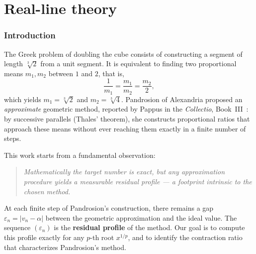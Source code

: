 \documentclass[11pt,a4paper]{article}
\theoremstyle{definition}
\newcommand{\cbrt}[1]{\sqrt[3]{#1}}
\newcommand{\eps}{\varepsilon}
\begin{document}
\tableofcontents
\newpage

\part{Real-line theory}

\section{Introduction}

The Greek problem of doubling the cube consists of constructing a segment of length $\cbrt{2}$ from a unit segment. It is equivalent to finding two proportional means $m_1, m_2$ between $1$ and $2$, that is,
\[
  \frac{1}{m_1} = \frac{m_1}{m_2} = \frac{m_2}{2},
\]
which yields $m_1 = \cbrt{2}$ and $m_2 = \cbrt{4}$. Pandrosion of Alexandria proposed an \emph{approximate} geometric method, reported by Pappus in the \textit{Collectio}, Book~III~\cite{pappus}: by successive parallels (Thales' theorem), she constructs proportional ratios that approach these means without ever reaching them exactly in a finite number of steps.

\medskip

This work starts from a fundamental observation:

\begin{quote}
\itshape Mathematically the target number is exact, but any approximation procedure yields a measurable residual profile --- a footprint intrinsic to the chosen method.
\end{quote}

At each finite step of Pandrosion's construction, there remains a gap $\eps_n = |v_n - \alpha|$ between the geometric approximation and the ideal value. The sequence $(\eps_n)$ is the \textbf{residual profile} of the method. Our goal is to compute this profile exactly for any $p$-th root $x^{1/p}$, and to identify the contraction ratio that characterizes Pandrosion's method.

\medskip
\end{document}
